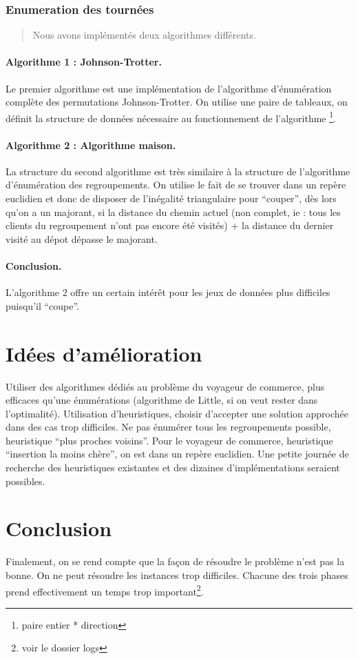 \documentclass[a4paper,10pt]{article}
\begin{document}
\subsubsection{Enumeration des tournées}

\begin{quote}
  Nous avons implémentés deux algorithmes différents.
\end{quote}
\paragraph{Algorithme 1 : Johnson-Trotter.}

Le premier algorithme est une implémentation de l'algorithme d'énumération complète des permutations Johnson-Trotter.
On utilise une paire de tableaux, on définit la structure de données nécessaire au fonctionnement de l'algorithme
\footnote{paire entier * direction}.

\paragraph{Algorithme 2 : Algorithme maison.}

La structure du second algorithme est très similaire à la structure de l'algorithme d'énumération des regroupements. 
On utilise le fait de se trouver dans un repère euclidien et donc de disposer de l'inégalité triangulaire pour ``couper'',
dès lors qu'on a un majorant, si la distance du chemin actuel (non complet, ie : tous les clients du regroupement
n'ont pas encore été visités) + la distance du dernier visité au dépot dépasse le majorant.

\paragraph{Conclusion.}

L'algorithme 2 offre un certain intérêt pour les jeux de données plus difficiles puisqu'il ``coupe''.

\section{Idées d'amélioration}
Utiliser des algorithmes dédiés au problème du voyageur de commerce, plus efficaces qu'une énumérations
(algorithme de Little, si on veut rester dans l'optimalité).
Utilisation d'heuristiques, choisir d'accepter une solution approchée dans des cas trop difficiles.
Ne pas énumérer tous les regroupements possible, heuristique ``plus proches voisins''.
Pour le voyageur de commerce, heuristique ``insertion la moins chère'', on est dans un repère euclidien.
Une petite journée de recherche des heuristiques existantes et des dizaines d'implémentations seraient possibles.

\section{Conclusion}
Finalement, on se rend compte que la façon de résoudre le problème n'est pas la bonne. On ne peut résoudre les instances 
trop difficiles. Chacune des trois phases prend effectivement un temps trop important\footnote{voir le dossier logs}.
\end{document}

